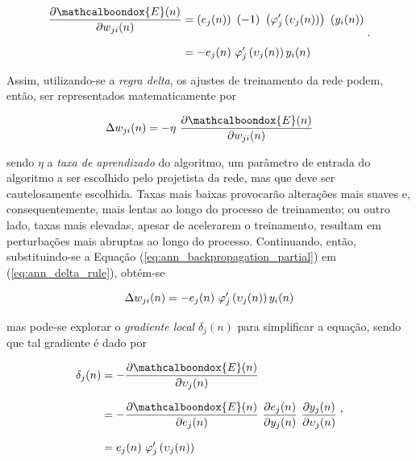 \begin{equation}
    \setlength{\jot}{10pt}
    \begin{align}
    \dfrac{\partial \mathcalboondox{E}(n)}{\partial w_{ji}(n)} & = \left(e_{j}(n)\right)\ \left(-1\right)\ \left(\varphi_{j}'\left(\upsilon_{j}(n)\right)\right)\ \left(y_{i}(n)\right)\\
     & = -e_{j}(n)\ \varphi_{j}'\left(\upsilon_{j}(n)\right) y_{i}(n)
    \end{align}
    \label{eq:ann_backpropagation_partial}
    \hspace{0.1cm}.
    \vspace{0.2cm}
\end{equation}

Assim, utilizando-se a \textit{regra delta}, os ajustes de treinamento da rede podem, então, ser representados matematicamente por

\begin{equation}
    \Delta w_{ji}(n) = - \eta\ \dfrac{\partial \mathcalboondox{E}(n)}{\partial w_{ji}(n)}
    \label{eq:ann_delta_rule}
    \vspace{0.2cm}
\end{equation}

\noindent sendo $\eta$ a \textit{taxa de aprendizado} do algoritmo, um parâmetro de entrada do algoritmo a ser escolhido pelo projetista da rede, mas que deve ser cautelosamente escolhida. Taxas mais baixas provocarão alterações mais suaves e, consequentemente, mais lentas ao longo do processo de treinamento; ou outro lado, taxas mais elevadas, apesar de acelerarem o treinamento, resultam em perturbações mais abruptas ao longo do processo. Continuando, então, substituindo-se a Equação (\ref{eq:ann_backpropagation_partial}) em (\ref{eq:ann_delta_rule}), obtém-se

\begin{equation}
    \Delta w_{ji}(n) = -e_{j}(n)\ \varphi_{j}'\left(\upsilon_{j}(n)\right) y_{i}(n)
    \label{eq:ann_gradient_adjust_unfinished}
    \vspace{0.2cm}
\end{equation}

\noindent mas pode-se explorar o \textit{gradiente local} $\delta_{j}(n)$ para simplificar a equação, sendo que tal gradiente é dado por

\begin{equation}
    \setlength{\jot}{10pt}
    \begin{align}
    \delta_{j}(n)   & = - \dfrac{\partial \mathcalboondox{E}(n)}{\partial \upsilon_{j}(n)}\\
                    & = - \dfrac{\partial \mathcalboondox{E}(n)}{\partial e_{j}(n)}\ \dfrac{\partial e_{j}(n)}{\partial y_{j}(n)}\ \dfrac{\partial y_{j}(n)}{\partial \upsilon_{j}(n)}\\
                    & = e_{j}(n)\ \varphi_{j}'\left(\upsilon_{j}(n)\right)
    \end{align}
    \label{eq:ann_backpropagation_gradient}
    \hspace{0.1cm},
    \vspace{0.2cm}
\end{equation}

